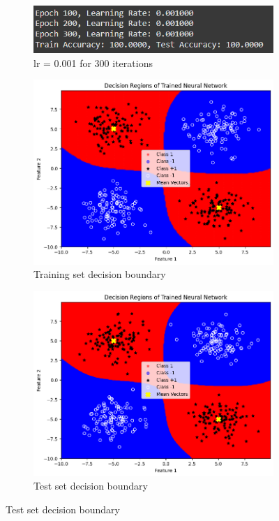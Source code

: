 \documentclass[a4paper,12pt]{article}
\begin{document}
\begin{figure}[H]
    \centering
    \captionsetup[subfigure]{list=true} %

    \begin{subfigure}{0.5\textwidth}
        \centering
        \includegraphics[width=\textwidth]{2.3_.001_300_r.png}
        \caption{lr = 0.001 for 300 iterations}
    \end{subfigure}
    \begin{subfigure}{0.45\textwidth}
        \centering
        \includegraphics[width=\textwidth]{2.3_.001_300_Train.png}
        \caption{Training set decision boundary}
    \end{subfigure}

    \begin{subfigure}{0.45\textwidth}
        \centering
        \includegraphics[width=\textwidth]{2.3_.001_300_Test.png}
        \caption{Test set decision boundary}
    \end{subfigure}


\end{figure}
\end{document}
